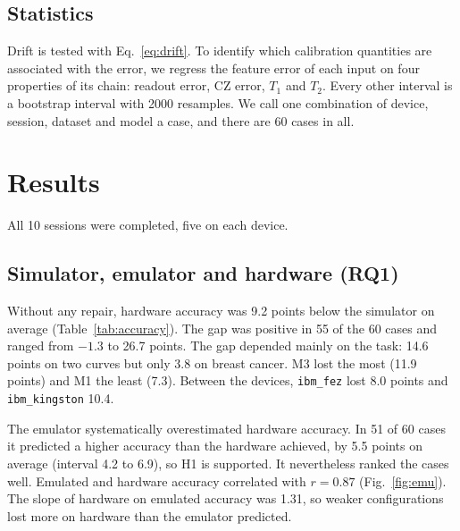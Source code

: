 \documentclass[10pt,conference]{IEEEtran}
\begin{document}
\subsection{Statistics}
Drift is tested with Eq.~\eqref{eq:drift}. To identify which calibration quantities are associated with the error, we regress the feature error of each input on four properties of its chain: readout error,
CZ error, $T_1$ and $T_2$. Every other interval is a bootstrap interval with 2000 resamples. We call
one combination of device, session, dataset and model a case, and there are 60 cases in all.

\section{Results}

All 10 sessions were completed, five on each device.

\subsection{Simulator, emulator and hardware (RQ1)}
Without any repair, hardware accuracy was 9.2 points below the simulator on average
(Table~\ref{tab:accuracy}). The gap was positive in 55 of the 60 cases and ranged from $-1.3$ to
26.7 points. The gap depended mainly on the task: 14.6 points on two curves but only 3.8 on breast
cancer. M3 lost the most (11.9 points) and M1 the least (7.3). Between the devices,
\texttt{ibm\_fez} lost 8.0 points and \texttt{ibm\_kingston} 10.4.

The emulator systematically overestimated hardware accuracy. In 51 of 60 cases it predicted a
higher accuracy than the hardware achieved, by 5.5 points on average (interval 4.2 to 6.9), so H1 is supported. It nevertheless ranked the cases well. Emulated and hardware accuracy correlated with $r=0.87$ (Fig.~\ref{fig:emu}).
The slope of hardware on emulated accuracy was 1.31, so weaker configurations lost more on
hardware than the emulator predicted.
\end{document}
